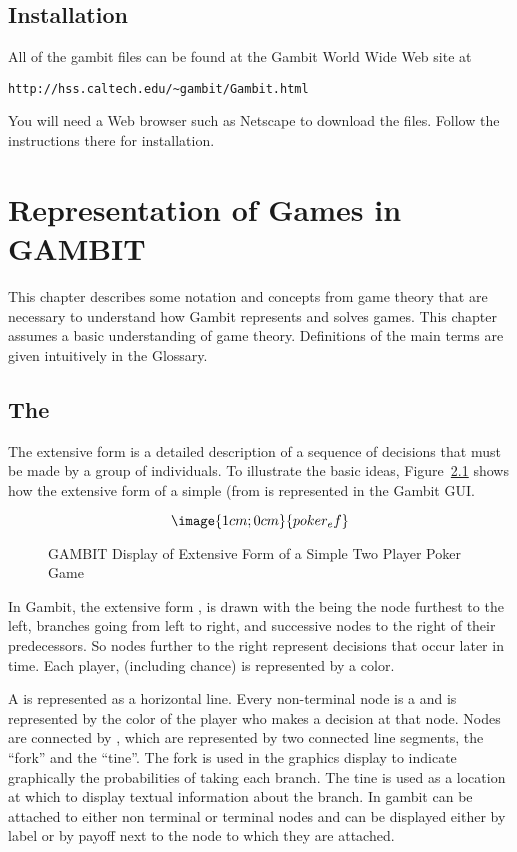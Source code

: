 \section{Installation}
All of the gambit files can be found at the Gambit World Wide Web site
at 

\begin{verbatim}
http://hss.caltech.edu/~gambit/Gambit.html
\end{verbatim}

You will need a Web browser such as Netscape to download the files.  Follow the 
instructions there for installation.  
 
\chapter{Representation of Games in GAMBIT}

This chapter describes some notation and concepts from game theory
that are necessary to understand how Gambit represents and solves
games.  This chapter assumes a basic understanding of game
theory.  Definitions of the main terms are given intuitively in the
Glossary.

\section{The }\label{extformsec}

The extensive form is a detailed description of a sequence of decisions 
that must be made by a group of individuals. To illustrate the basic ideas,
 Figure~\ref{fig_samp1} 
shows how the extensive form of a simple 
 (from \cite{Mye:91} is represented
 in the Gambit GUI.  

\begin{figure}\label{fig_samp1}
$$\image{1cm;0cm}{poker_ef}$$
\caption{GAMBIT Display of Extensive Form of
		a Simple Two Player Poker Game}\label{fig_samp1}
\end{figure}

In Gambit, the extensive form , is drawn with the 
 being the node furthest to the left,
branches going from left to right, and successive 
nodes to the right of 
their predecessors.  So nodes further to the right represent decisions 
that occur later in time.  Each player, (including chance) is represented by a color.  

A  is represented as a 
horizontal line.  Every non-terminal node is a  
and is represented by the color of the player who makes a decision at that node.  
Nodes are connected by , which are represented by two 
connected line segments, the ``fork'' and the ``tine''.  The fork is used in 
the graphics display to indicate graphically the probabilities of taking each 
branch.  The tine is used as a location at which to display textual information 
about the branch.  In gambit  can 
be attached to either non terminal or terminal nodes and can 
be displayed either by label or by payoff next to the node to 
which they are attached.  

